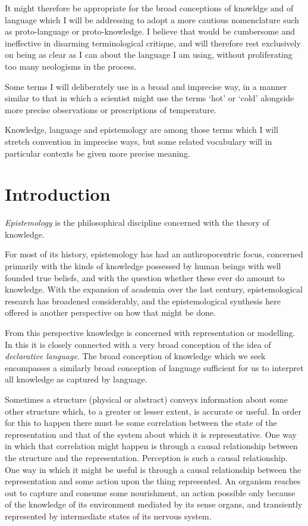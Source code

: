 \documentclass[10pt,titlepage]{book}
\begin{document}
It might therefore be appropriate for the broad conceptions of knowldge and of language which I will be addressing to adopt a more cautious nomenclature such as proto-language or proto-knowledge.
I believe that would be cumbersome and ineffective in disarming terminological critique, and will therefore rest exclusively on being as clear as I can about the language I am using, without proliferating too many neologisms in the process.

Some terms I will deliberately use in a broad and imprecise way, in a manner similar to that in which a scientist might use the terms `hot' or `cold' alongside more precise observations or prescriptions of temperature.

Knowledge, language and epistemology are among those terms which I will stretch convention in imprecise ways, but some related vocabulary will in particular contexts be given more precise meaning.

\chapter{Introduction}

\emph{Epistemology} is the philosophical discipline concerned with the theory of knowledge.

For most of its history, epistemology has had an anthropocentric focus, concerned primarily with the kinds of knowledge possessed by human beings with well founded true beliefs, and with the question whether these ever do amount to knowledge.
With the expansion of academia over the last century, epistemological research has broadened considerably, and the epistemological synthesis here offered is another perspective on how that might be done.

From this perspective knowledge is concerned with representation or modelling.
In this it is closely connected with a very broad conception of the idea of \emph{declarative language}.
The broad conception of knowledge which we seek encompasses a similarly broad conception of language sufficient for us to interpret all knowledge as captured by language.

Sometimes a structure (physical or abstract) conveys information about some other structure which, to a greater or lesser extent, is accurate or useful.
In order for this to happen there must be some correlation between the state of the representation and that of the system about which it is representative.
One way in which that correlation might happen is through a causal relationship between the structure and the representation.
Perception is such a causal relationship.
One way in which it might be useful is through a causal relationship between the representation and some action upon the thing represented.
An organism reaches out to capture and consume some nourishment, an action possible only because of the knowledge of its environment mediated by its sense organs, and transiently represented by intermediate states of its nervous system.
\end{document}
